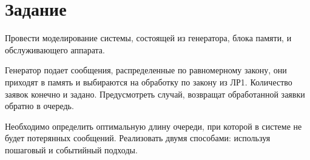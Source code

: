 \chapter{Задание}

Провести моделирование системы, состоящей из генератора, блока памяти, и обслуживающего аппарата. 

Генератор подает сообщения, распределенные по равномерному закону, они приходят в память и выбираются на обработку по закону из ЛР1. Количество заявок конечно и задано. Предусмотреть случай, возвращат обработанной заявки обратно в очередь. 

Необходимо определить оптимальную длину очереди, при которой в системе не будет потерянных сообщений. Реализовать двумя способами: используя пошаговый и событийный подходы.
